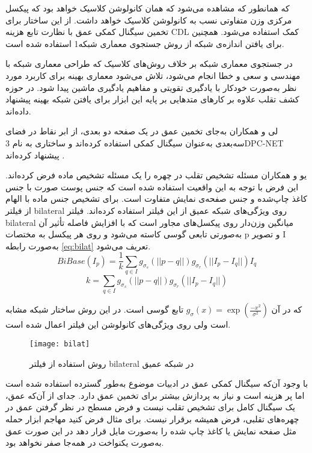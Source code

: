 که همانطور که مشاهده می‌شود که همان کانولوشن کلاسیک خواهد بود که پیکسل مرکزی وزن متفاوتی نسب به کانولوشن کلاسیک خواهد داشت. از این ساختار برای تخمین سیگنال کمکی عمق با نظارت تابع هزینه CDL کمک استفاده می‌شود. همچنین برای یافتن اندازه‌ی شبکه از روش جستجوی معماری شبکه1 
\cite{zoph2016neural}
استفاده شده است.

در جستجوی معماری شبکه بر خلاف روش‌های کلاسیک که طراحی معماری شبکه با مهندسی و سعی و خطا انجام می‌شود، تلاش می‌شود معماری بهینه برای کاربرد مورد نظر به‌صورت خودکار با یادگیری تقویتی و مفاهیم یادگیری ماشین پیدا شود. در حوزه کشف تقلب علاوه بر
\cite{zoph2016neural}
کارهای
\cite{yu2020fas,yu2020auto} 
متدهایی بر پایه این ابزار برای یافتن شبکه بهینه پیشنهاد داده‌اند.
 
 لی و همکاران به‌جای تخمین عمق در یک صفحه دو بعدی، از ابر نقاط در فضای سه‌بعدی به‌عنوان سیگنال کمکی استفاده کرده‌اند و ساختاری به نام 3DPC-NET پیشنهاد کرده‌اند
\cite{li20203dpc}.
 
 یو و همکاران 
\cite{yu2020face}
 مسئله تشخیص تقلب در چهره را یک مسئله تشخیص ماده فرض کرده‌اند. این فرض با توجه به این واقعیت استفاده شده است که جنس پوست صورت با جنس کاغذ چاپ‌شده و جنس صفحه‌ی نمایش متفاوت است. برای تشخیص جنس ماده با الهام از فیلتر bilateral روی ویژگی‌های شبکه عمیق از این فیلتر استفاده کرده‌اند. فیلتر bilateral میانگین وزن‌دار روی پیکسل‌های مجاور است که با افزایش فاصله تأثیر آن به‌صورتی تابعی گوسی کاسته می‌شود و روی هر پیکسل به مختصات p و تصویر I به‌صورت رابطه 
\ref{eq:bilat}  
 تعریف می‌شود.
\begin{equation}\label{eq:bilat}
	BiBase(I_p)=\frac{1}{k}\sum_{q\in I}{g_{\sigma_s}(||p-q||)g_{\sigma_r}(||I_p-I_q||)I_q}
\end{equation}
\begin{equation}\label{eq:bilat}
	k=\sum_{q\in I}{g_{\sigma_s}(||p-q||)g_{\sigma_r}(||I_p-I_q||)}
	\nonumber
\end{equation}

که در آن
$g_\sigma (x) = \exp(\frac{-x^2}{\sigma^2})$
تابع گوسی است. در این روش ساختار شبکه مشابه
\cite{liu2018learning}
 است ولی روی ویژگی‌های کانولوشن این فیلتر اعمال شده است.
 
\begin{figure}[t]
 	\centerline{\texttt{[image: bilat]}}
 	\caption{روش استفاده از فیلتر bilateral در شبکه عمیق \cite{yu2020face} }
 	\label{fig:bilat}
\end{figure}

با وجود آن‌که سیگنال کمکی عمق در ادبیات موضوع به‌طور گسترده استفاده شده است اما پر هزینه است و نیاز به پردازش بیشتر برای تخمین عمق دارد. جدای از آن‌که عمق، یک سیگنال کامل برای تشخیص تقلب نیست و فرض مسطح در نظر گرفتن عمق در چهره‌های تقلبی، فرض همیشه برقرار نیست. برای مثال فرض کنید مهاجم ابزار حمله مثل صفحه نمایش یا کاغذ چاپ شده را به‌صورت مایل قرار دهد در این صورت عمق به‌صورت یکنواخت در همه‌جا صفر نخواهد بود.

